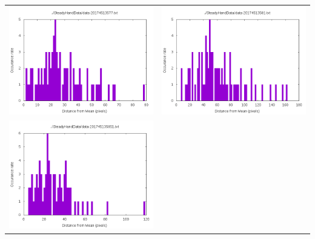 \documentclass[12pt,letterpaper]{article}
\begin{document}
\begin{table}
\begin{tabular}{cc}
\includegraphics[scale=.5]{graph-data-20174513577.png} &
\includegraphics[scale=.5]{graph-data-20174513581.png}\\
\includegraphics[scale=.5]{graph-data-201745135851.png} &

\end{tabular}
\end{table}
\end{document}
